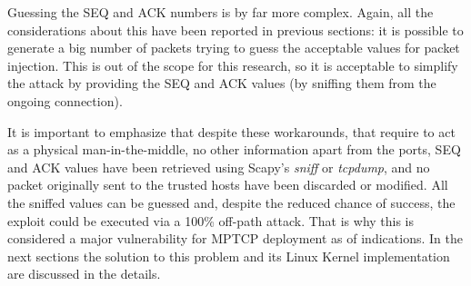 Guessing the SEQ and ACK numbers is by far more complex. Again, all the considerations about this have been reported in previous sections: it is possible to generate a big number of packets trying to guess the acceptable values for packet injection. This is out of the scope for this research, so it is acceptable to simplify the attack by providing the SEQ and ACK values (by sniffing them from the ongoing connection).

It is important to emphasize that despite these workarounds, that require to act as a physical man-in-the-middle, no other information apart from the ports, SEQ and ACK values have been retrieved using Scapy's \textit{sniff} or \textit{tcpdump}, and no packet originally sent to the trusted hosts have been discarded or modified. All the sniffed values can be guessed and, despite the reduced chance of success, the exploit could be executed via a 100\% off-path attack. That is why this is considered a major vulnerability for MPTCP deployment as of  indications. In the next sections the solution to this problem and its Linux Kernel implementation are discussed in the details.